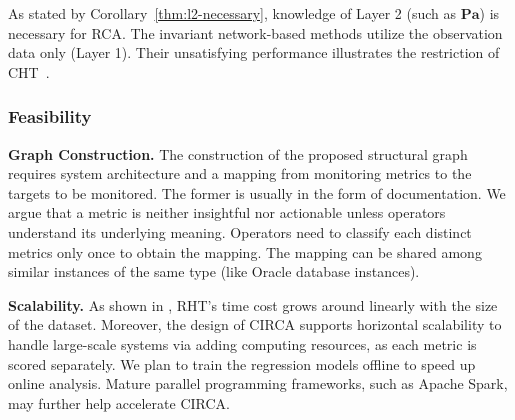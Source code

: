 As stated by Corollary~\ref{thm:l2-necessary}, knowledge of Layer 2 (such as $\mathbf{Pa}$) is necessary for RCA.
The invariant network-based methods utilize the observation data only (Layer 1).
Their unsatisfying performance illustrates the restriction of CHT~\cite{Bareinboim:2022}.

\subsubsection{Feasibility}

\noindent
\textbf{Graph Construction.}
The construction of the proposed structural graph requires system architecture and a mapping from monitoring metrics to the targets to be monitored.
The former is usually in the form of documentation.
We argue that a metric is neither insightful nor actionable unless operators understand its underlying meaning.
Operators need to classify each distinct metrics only once to obtain the mapping.
The mapping can be shared among similar instances of the same type (like Oracle database instances).

\noindent
\textbf{Scalability.}
As shown in , RHT's time cost grows around linearly with the size of the dataset.
Moreover, the design of CIRCA supports horizontal scalability to handle large-scale systems via adding computing resources, as each metric is scored separately.
We plan to train the regression models offline to speed up online analysis.
Mature parallel programming frameworks, such as Apache Spark, may further help accelerate CIRCA.
